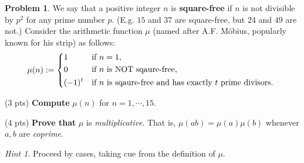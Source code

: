 \documentclass[11pt]{article}
\theoremstyle{plain}
\theoremstyle{definition}
\newtheorem{problem}{Problem}
\theoremstyle{remark}
\newtheorem*{hint}{Hint}
\numberwithin{equation}{problem}
\begin{document}
\begin{problem}
	We say that a positive integer $n$ is \textbf{square-free} if $n$ is not divisible by $p^2$ for any prime number $p$. (E.g. $15$ and $37$ are square-free, but $24$ and $49$ are not.) 
	Consider the arithmetic function $\mu$ (named after A.F. M\"obius, popularly known for his strip) as follows:
	\[
		\mu(n) := 
		\begin{dcases*}
			1 & if $n=1$,\\
			0 & if $n$ is NOT sqaure-free,\\
			(-1)^{t} & if $n$ is sqaure-free and has exactly $t$ prime divisors.
		\end{dcases*}
	\]
	\begin{listinprob}
		\item (3 pts) \textbf{Compute} $\mu(n)$ for $n=1,\cdots,15$.
		\item (4 pts) \textbf{Prove that} $\mu$ is \emph{multiplicative}. That is, $\mu(ab)=\mu(a)\mu(b)$ whenever $a,b$ are \emph{coprime}.
		\begin{hint}
			Proceed by cases, taking cue from the definition of $\mu$.
		\end{hint}
	\end{listinprob}
\end{problem}
\end{document}
